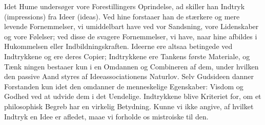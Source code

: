 \documentclass[12pt,a4paper]{book}
\begin{document}
Idet Hume undersøger vore Forestillingers Oprindelse, ad\-%
skiller han Indtryk (impressions) fra Ideer (ideas). Ved hine
forstaaer han de stærkere og mere levende Fornemmelser, vi
umiddelbart have ved vor Sandsning, vore Lidenskaber og
vore Følelser; ved disse de svagere Fornemmelser, vi have,
naar hine afbildes i Hukommelsen eller Indbildningskraften.
Ideerne ere altsaa betingede ved Indtrykkene og ere deres
Copier; Indtrykkene ere Tankens første Materiale, og Tænk\-%
ningen bestaaer kun i en Omdannen og Combineren af dem,
under hvilken den passive Aand styres af Ideeassociationens
Naturlov. Selv Gudsideen danner Forstanden kun idet den
omdanner de menneskelige Egenskaber: Visdom og Godhed ved
at udvide dem i det Uendelige. Indtrykkene blive Kriteriet
for, om et philosophisk Begreb har en virkelig Betydning.
Kunne vi ikke angive, af hvilket Indtryk en Idee er afledet,
maae vi forholde os mistroiske til den.
\end{document}
